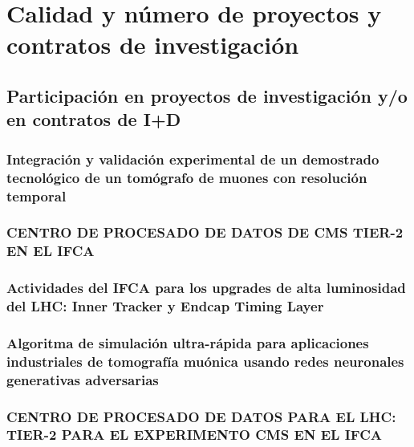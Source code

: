\documentclass[a4paper, 11pt, twoside, openright]{report}
\begin{document}
\section{Calidad y número de proyectos y contratos de investigación}

\subsection{Participación en proyectos de investigación y/o en contratos de I+D}

\subsubsection{Integración y validación experimental de un demostrado tecnológico de un tomógrafo de muones con resolución temporal}


\subsubsection{CENTRO DE PROCESADO DE DATOS DE CMS TIER-2 EN EL IFCA}


\subsubsection{Actividades del IFCA para los upgrades de alta luminosidad del LHC: Inner Tracker y Endcap Timing Layer}


\subsubsection{Algoritma de simulación ultra-rápida para aplicaciones industriales de tomografía muónica usando redes neuronales generativas adversarias}


\subsubsection{CENTRO DE PROCESADO DE DATOS PARA EL LHC: TIER-2 PARA EL EXPERIMENTO CMS EN EL IFCA}

\end{document}
